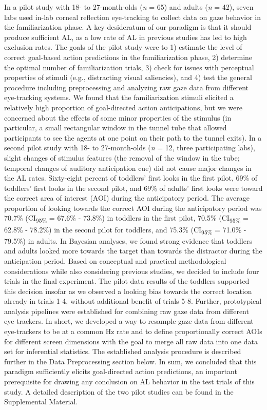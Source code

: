 \documentclass[
  english,
  man,floatsintext]{apa6}
\begin{document}
In a pilot study with 18- to 27-month-olds (\emph{n} = 65) and adults (\emph{n} = 42), seven labs used in-lab corneal reflection eye-tracking to collect data on gaze behavior in the familiarization phase. A key desideratum of our paradigm is that it should produce sufficient AL, as a low rate of AL in previous studies has led to high exclusion rates. The goals of the pilot study were to 1) estimate the level of correct goal-based action predictions in the familiarization phase, 2) determine the optimal number of familiarization trials, 3) check for issues with perceptual properties of stimuli (e.g., distracting visual saliencies), and 4) test the general procedure including preprocessing and analyzing raw gaze data from different eye-tracking systems. We found that the familiarization stimuli elicited a relatively high proportion of goal-directed action anticipations, but we were concerned about the effects of some minor properties of the stimulus (in particular, a small rectangular window in the tunnel tube that allowed participants to see the agents at one point on their path to the tunnel exits).
In a second pilot study with 18- to 27-month-olds (\emph{n} = 12, three participating labs), slight changes of stimulus features (the removal of the window in the tube; temporal changes of auditory anticipation cue) did not cause major changes in the AL rates.
Sixty-eight percent of toddlers' first looks in the first pilot, 69\% of toddlers' first looks in the second pilot, and 69\% of adults' first looks were toward the correct area of interest (AOI) during the anticipatory period. The average proportion of looking towards the correct AOI during the anticipatory period was 70.7\% (CI\textsubscript{95\%} = 67.6\% - 73.8\%) in toddlers in the first pilot, 70.5\% (CI\textsubscript{95\%} = 62.8\% - 78.2\%) in the second pilot for toddlers, and 75.3\% (CI\textsubscript{95\%} = 71.0\% - 79.5\%) in adults. In Bayesian analyses, we found strong evidence that toddlers and adults looked more towards the target than towards the distractor during the anticipation period. Based on conceptual and practical methodological considerations while also considering previous studies, we decided to include four trials in the final experiment. The pilot data results of the toddlers supported this decision insofar as we observed a looking bias towards the correct location already in trials 1-4, without additional benefit of trials 5-8.
Further, prototypical analysis pipelines were established for combining raw gaze data from different eye-trackers. In short, we developed a way to resample gaze data from different eye-trackers to be at a common Hz rate and to define proportionally correct AOIs for different screen dimensions with the goal to merge all raw data into one data set for inferential statistics. The established analysis procedure is described further in the Data Preprocessing section below.
In sum, we concluded that this paradigm sufficiently elicits goal-directed action predictions, an important prerequisite for drawing any conclusion on AL behavior in the test trials of this study. A detailed description of the two pilot studies can be found in the Supplemental Material.
\end{document}
